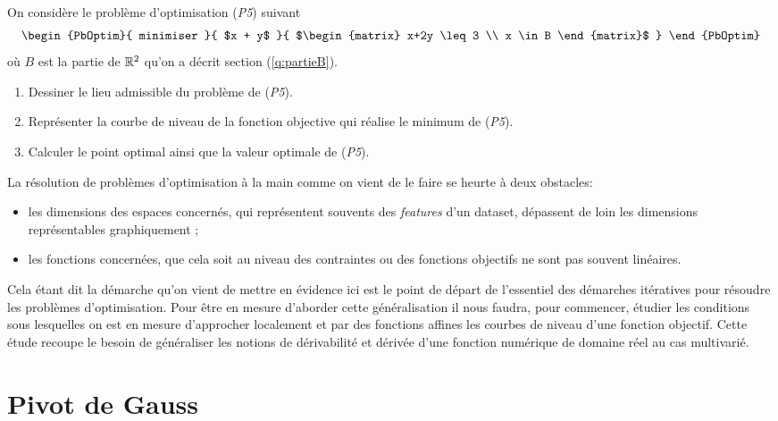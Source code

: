 \documentclass[11pt, a4paper]{article}
\begin{document}
\begin{question}
  On considère le problème d'optimisation (\emph{P5}) suivant
  \[
    \begin{PbOptim}{
        minimiser
      }{
        $x + y$
      }{
        $\begin{matrix}
          x+2y \leq 3 \\
          x \in B
        \end{matrix}$
      }
    \end{PbOptim}
  \]
  où $B$ est la partie de $\mathbb{R}^2$ qu'on a décrit section
  (\ref{q:partieB}).
  \begin{enumerate}
  \item Dessiner le lieu admissible du problème de (\emph{P5}).
  \item Représenter la courbe de niveau de la fonction objective qui
    réalise le minimum de (\emph{P5}).
  \item Calculer le point optimal ainsi que la valeur optimale de
    (\emph{P5}).
  \end{enumerate}
\end{question}

La résolution de problèmes d'optimisation à la main comme on vient de
le faire se heurte à deux obstacles:
\begin{itemize}
\item les dimensions des espaces concernés, qui représentent souvents
  des \textit{features} d'un dataset, dépassent de loin les dimensions
  représentables graphiquement ;
\item les fonctions concernées, que cela soit au niveau des
  contraintes ou des fonctions objectifs ne sont pas souvent
  linéaires.
\end{itemize}
Cela étant dit la démarche qu'on vient de mettre en évidence ici est
le point de départ de l'essentiel des démarches itératives pour
résoudre les problèmes d'optimisation. Pour être en mesure d'aborder
cette généralisation il nous faudra, pour commencer, étudier les
conditions sous lesquelles on est en mesure d'approcher localement et
par des fonctions affines les courbes de niveau d'une fonction
objectif. Cette étude recoupe le besoin de généraliser les notions de
dérivabilité et dérivée d'une fonction numérique de domaine réel au
cas multivarié.

\appendix

\section{Pivot de Gauss}
\label{sec:pivotGauss}
\end{document}
